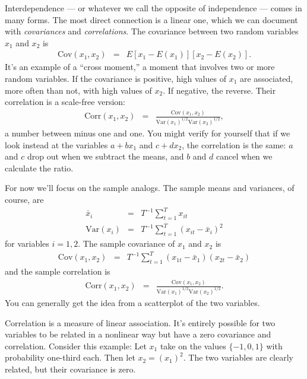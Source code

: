 Interdependence  ---
or whatever we call the opposite of independence ---
comes in many forms.
The most direct connection is a linear one,
which we can document with {\it covariances\/}
and {\it correlations\/}.
The covariance between two  random variables $x_1$ and $x_2$ is
\begin{eqnarray*}
    \mbox{Cov} (x_1,x_2) &=& E [x_{1} - E({x}_1)] [x_{2} - E({x}_2)] .
\end{eqnarray*}
It's an example of a ``cross moment,''
a moment that involves two or more random variables.
If the covariance is positive, high values of $x_1$ are associated,
more often than not, with high values of $x_2$.
If negative, the reverse.
Their correlation is a scale-free version:
\begin{eqnarray*}
    \mbox{Corr}(x_1,x_2) &=&
            \frac {\mbox{Cov}(x_1,x_2)} {\mbox{Var}(x_1)^{1/2} \mbox{Var}(x_2)^{1/2} } ,
\end{eqnarray*}
a number between minus one and one.
You might verify for yourself that if we look instead at the
variables $a + bx_1$ and $c + dx_2$, the correlation is the same:
$a$ and $c$ drop out when we subtract the means, and
$b$ and $d$ cancel when we calculate the ratio.


For now we'll focus on the sample analogs.
The sample means and variances, of course, are
\begin{eqnarray*}
    \bar{x}_i &=& T^{-1} \sum_{t=1}^T x_{it} \\
    \mbox{Var} (x_i) &=& T^{-1}
            \sum_{t=1}^T (x_{it} - \bar{x}_i)^2
\end{eqnarray*}
for variables $i=1,2$.
The sample covariance of $x_1$ and $x_2$ is
\begin{eqnarray*}
    \mbox{Cov} (x_1,x_2) &=& T^{-1}
            \sum_{t=1}^T (x_{1t} - \bar{x}_1) (x_{2t} - \bar{x}_2)
\end{eqnarray*}
and the sample correlation is
\begin{eqnarray*}
    \mbox{Corr}(x_1,x_2) &=&
            \frac {\mbox{Cov}(x_1,x_2)} {\mbox{Var}(x_1)^{1/2} \mbox{Var}(x_2)^{1/2} } .
\end{eqnarray*}
You can generally get the idea from a scatterplot of the two variables.


Correlation is a measure of linear association.
It's entirely possible for two variables to be related
in a nonlinear way but have a zero covariance and correlation.
Consider this example:
Let $x_1$ take on the values $\{-1,0,1\}$ with probability one-third each.
Then let $x_2 = (x_1)^2$.
The two variables are clearly related, but their covariance is zero.


